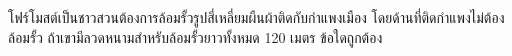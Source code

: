 ﻿%
\question โฟร์โมสต์เป็นชาวสวนต้องการล้อมรั้วรูปสี่เหลี่ยมผืนผ้าติดกับกำแพงเมือง โดยด้านที่ติดกำแพงไม่ต้องล้อมรั้ว ถ้าเขามีลวดหนามสำหรับล้อมรั้วยาวทั้งหมด 120 เมตร ข้อใดถูกต้อง
\newline
{}
